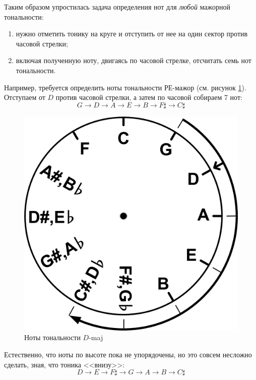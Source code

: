 Таким образом упростилась задача определения нот для \emph{любой} мажорной тональности: 
\begin{enumerate}
    \item нужно отметить тонику на круге и отступить от нее на один сектор против часовой стрелки;
    \item включая полученную ноту, двигаясь по часовой стрелке, отсчитать семь нот тональности.
\end{enumerate}

Например, требуется определить ноты тональности РЕ-мажор (см. рисунок \ref{fig:harmony:kvinto-kvarto:d-maj}). Отступаем от $D$ против часовой стрелки, а затем по часовой собираем 7 нот:
\[
    G\rightarrow 
    D\rightarrow 
    A\rightarrow 
    E\rightarrow 
    B\rightarrow 
    {F\sharp}\rightarrow
    {C\sharp}
\]

\begin{figure}[!ht]
    \centering
    \includegraphics[scale=0.5]{fig/kvinto-kvarto/kvinto-kvarto-d-maj} 
    \caption{Ноты тональности $D$-maj}\label{fig:harmony:kvinto-kvarto:d-maj}
\end{figure}

Естественно, что ноты по высоте пока не упорядочены, но это совсем несложно сделать, зная, что тоника <<внизу>>:
\[
    D\rightarrow 
    E\rightarrow 
    {F\sharp}\rightarrow
    G\rightarrow 
    A\rightarrow 
    B\rightarrow 
    {C\sharp}
\]

